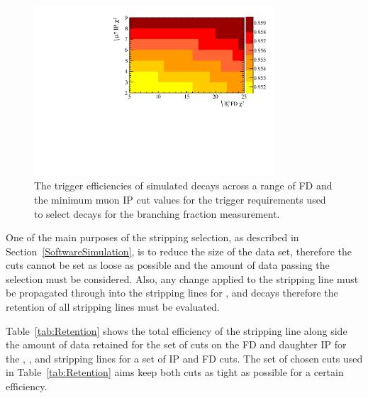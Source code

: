 \begin{figure}[htbp]
   \centering
        \includegraphics[width=0.8\textwidth]{./Figs/Selection/Dec_trigger_chart.pdf}
    \caption{The trigger efficiencies of \bsmumu simulated decays across a range of \bs FD \chisqd and the minimum muon IP \chisqd cut values for the trigger requirements used to select \bmumu decays for the branching fraction measurement. }
    \label{fig:triggereffplots}
\end{figure}





One of the main purposes of the stripping selection, as described in Section~\ref{SoftwareSimulation}, is to reduce the size of the data set, therefore the cuts cannot be set as loose as possible and the amount of data passing the selection must be considered. Also, any change applied to the \bmumu stripping line must be propagated through into the stripping lines for \bhh, \bujpsik and \bsjpsiphi decays therefore the retention of all stripping lines must be evaluated.

Table~\ref{tab:Retention} shows the total efficiency of the \bsmumu stripping line along side the amount of data retained for the set of cuts on the FD \chisqd and daughter IP \chisqd for the \bmumu, \bhh, \bujpsik and \bsjpsiphi stripping lines for a set of IP \chisqd and FD \chisqd cuts. %
The set of chosen cuts used in Table~\ref{tab:Retention} aims keep both cuts as tight as possible for a certain \bsmumu efficiency. 



